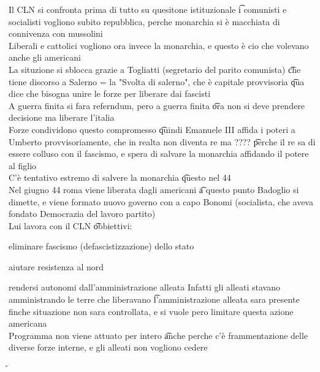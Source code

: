 \documentclass[12pt]{article}
\begin{document}
Il CLN si confronta prima di tutto su quesitone istituzionale \t i comunisti e socialisti vogliono subito repubblica, perche monarchia si è macchiata di connivenza con mussolini \\
Liberali e cattolici vogliono ora invece la monarchia, e questo è cio che volevano anche gli americani \\
La situzione si sblocca grazie a Togliatti (segretario del parito comunista) \t che tiene discorso a Salerno = la "Svolta di salerno", che è capitale provvisoria \t qua dice che bisogna unire le forze per liberare dai fascisti \\
A guerra finita si fara referndum, pero a guerra finita \t ora non si deve prendere decisione ma liberare l'italia \\
Forze condividono questo compromesso \t quindi Emanuele III affida i poteri a Umberto provvisoriamente, che in realta non diventa re ma ???? \t perche il re sa di essere colluso con il fascismo, e spera di salvare la monarchia affidando il potere al figlio \\
C'è tentativo estremo di salvere la monarchia \t questo nel 44 \\
Nel giugno 44 roma viene liberata dagli americani \t a questo punto Badoglio si dimette, e viene formato nuovo governo con a capo Bonomi (socialista, che aveva fondato Democrazia del lavoro partito) \\
Lui lavora con il CLN \t obbiettivi:
\bi
\item eliminare fascismo (defascistizzazione) dello stato 
\item aiutare resistenza al nord
\item rendersi autonomi dall'amministrazione alleata 
\ei
Infatti gli alleati stavano amministrando le terre che liberavano \t l'amministrazione alleata sara presente finche situazione non sara controllata, e si vuole pero limitare questa azione americana \\
Programma non viene attuato per intero \t anche perche c'è frammentazione delle diverse forze interne, e gli alleati non vogliono cedere

\v
\end{document}
